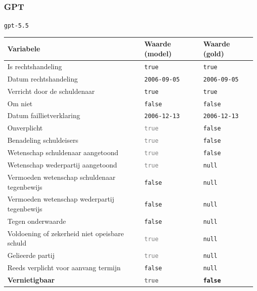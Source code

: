 \documentclass[
  dutch,
  a4paper,
]{article}
\begin{document}
\newpage


\subsubsection{GPT}\label{gpt-26}

\texttt{gpt-5.5}

\begin{center}
\small
\begin{tabular}{@{}p{7.4cm}p{2.6cm}p{2.6cm}@{}}
\toprule
Variabele & Waarde (model) & Waarde (gold) \\
\midrule
Is rechtshandeling & \texttt{true} & \texttt{true} \\
Datum rechtshandeling & \texttt{2006-09-05} & \texttt{2006-09-05} \\
Verricht door de schuldenaar & \texttt{true} & \texttt{true} \\
Om niet & \texttt{false} & \texttt{false} \\
Datum faillietverklaring & \texttt{2006-12-13} & \texttt{2006-12-13} \\
Onverplicht & \textcolor{gray}{\texttt{true}} & \texttt{false} \\
Benadeling schuldeisers & \textcolor{gray}{\texttt{true}} & \texttt{false} \\
Wetenschap schuldenaar aangetoond & \textcolor{gray}{\texttt{true}} & \texttt{false} \\
Wetenschap wederpartij aangetoond & \textcolor{gray}{\texttt{true}} & \texttt{null} \\
Vermoeden wetenschap schuldenaar tegenbewijs & \texttt{false} & \texttt{null} \\
Vermoeden wetenschap wederpartij tegenbewijs & \texttt{false} & \texttt{null} \\
Tegen onderwaarde & \texttt{false} & \texttt{null} \\
Voldoening of zekerheid niet opeisbare schuld & \textcolor{gray}{\texttt{true}} & \texttt{null} \\
Gelieerde partij & \textcolor{gray}{\texttt{true}} & \texttt{null} \\
Reeds verplicht voor aanvang termijn & \texttt{false} & \texttt{null} \\
\textbf{Vernietigbaar} & \textbf{\textcolor{gray}{\texttt{true}}} & \textbf{\texttt{false}} \\
\bottomrule
\end{tabular}
\end{center}
\end{document}
